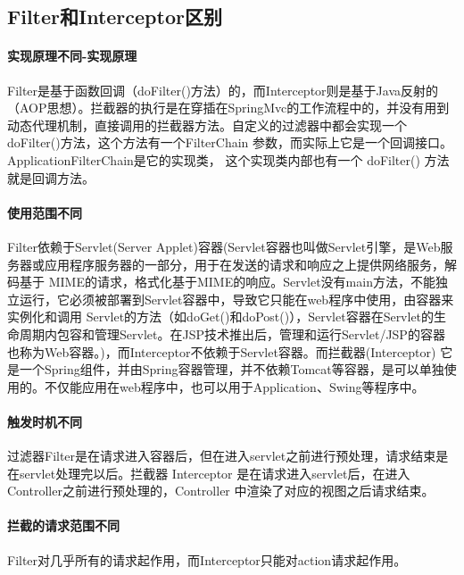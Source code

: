 \documentclass[../../../interview-questions.tex]{subfiles}
\begin{document}
\subsection{Filter和Interceptor区别}

\paragraph{实现原理不同-实现原理}

Filter是基于函数回调（doFilter()方法）的，而Interceptor则是基于Java反射的（AOP思想）。拦截器的执行是在穿插在SpringMvc的工作流程中的，并没有用到动态代理机制，直接调用的拦截器方法。自定义的过滤器中都会实现一个 doFilter()方法，这个方法有一个FilterChain 参数，而实际上它是一个回调接口。ApplicationFilterChain是它的实现类， 这个实现类内部也有一个 doFilter() 方法就是回调方法。

\paragraph{使用范围不同}

Filter依赖于Servlet(Server Applet)容器(Servlet容器也叫做Servlet引擎，是Web服务器或应用程序服务器的一部分，用于在发送的请求和响应之上提供网络服务，解码基于 MIME的请求，格式化基于MIME的响应。Servlet没有main方法，不能独立运行，它必须被部署到Servlet容器中，导致它只能在web程序中使用，由容器来实例化和调用 Servlet的方法（如doGet()和doPost()），Servlet容器在Servlet的生命周期内包容和管理Servlet。在JSP技术推出后，管理和运行Servlet/JSP的容器也称为Web容器。)，而Interceptor不依赖于Servlet容器。而拦截器(Interceptor) 它是一个Spring组件，并由Spring容器管理，并不依赖Tomcat等容器，是可以单独使用的。不仅能应用在web程序中，也可以用于Application、Swing等程序中。

\paragraph{触发时机不同}

过滤器Filter是在请求进入容器后，但在进入servlet之前进行预处理，请求结束是在servlet处理完以后。拦截器 Interceptor 是在请求进入servlet后，在进入Controller之前进行预处理的，Controller 中渲染了对应的视图之后请求结束。

\paragraph{拦截的请求范围不同}

Filter对几乎所有的请求起作用，而Interceptor只能对action请求起作用。
\end{document}
